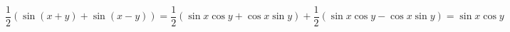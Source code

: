 \documentclass[nofonts]{ctexart}
\begin{document}
\begin{dmath}\label{eq:trigonometric}
	\frac{1}{2} (\sin{(x+y)} + \sin{(x-y)}) = \frac{1}{2} (\sin{x} 
	\cos{y} + \cos{x} \sin{y})
	+ \frac{1}{2} (\sin{x} \cos{y} - \cos{x}\sin{y}) = \sin{x}\cos{y}
\end{dmath}
\end{document}
